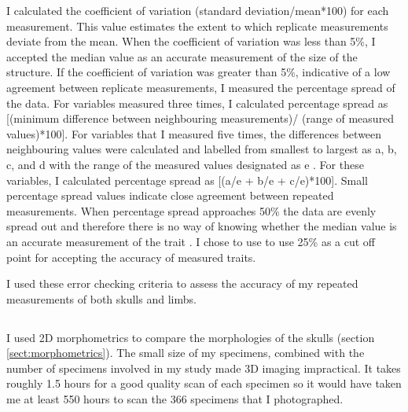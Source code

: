 	I calculated the coefficient of variation (standard deviation/mean*100) for each measurement. This value estimates the extent to which replicate measurements deviate from the mean. When the coefficient of variation was less than 5\%, I accepted the median value as an accurate measurement of the size of the structure. 
	If the coefficient of variation was greater than 5\%, indicative of a low agreement between replicate measurements, I measured the percentage spread of the data. For variables measured three times, I calculated percentage spread as [(minimum difference between neighbouring measurements)/ (range of measured values)*100].
	For variables that I measured five times, the differences between neighbouring values were calculated and labelled from smallest to largest as a, b, c, and d with the range of the measured values designated as e \citep{Cooper2009}. For these variables, I calculated percentage spread as [(a/e + b/e + c/e)*100]. 
	Small percentage spread values indicate close agreement between repeated measurements. When percentage spread approaches 50\% the data are evenly spread out and therefore there is no way of knowing whether the median value is an accurate measurement of the trait \citep{Cooper2009}. I chose to use to use 25\% as a cut off point for accepting the accuracy of measured traits.

	I used these error checking criteria to assess the accuracy of my repeated measurements of both skulls and limbs. 



\subsection{}

	I used 2D morphometrics to compare the morphologies of the skulls (section \ref{sect:morphometrics}). The small size of my specimens, combined with the number of specimens involved in my study made 3D imaging impractical. It takes roughly 1.5 hours for a good quality scan of each specimen so it would have taken me at least 550 hours to scan the 366 specimens that I photographed.
	 
